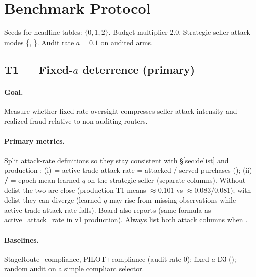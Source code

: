 \documentclass[sigconf,review]{acmart}
\begin{document}
\section{Benchmark Protocol}
\label{sec:protocol}

Seeds for headline tables: $\{0,1,2\}$. Budget multiplier $2.0$. Strategic seller attack modes \{, \}. Audit rate $a=0.1$ on audited arms.

\subsection*{T1 --- Fixed-$a$ deterrence (primary)}

\paragraph{Goal.} Measure whether fixed-rate oversight compresses seller attack intensity and realized fraud relative to non-auditing routers.

\paragraph{Primary metrics.} Split attack-rate definitions so they stay consistent with \S\ref{sec:delist} and production : (i) \textbf{} = active trade attack rate = attacked / served purchases (); (ii) \textbf{ / } = epoch-mean learned $q$ on the strategic seller (separate columns). Without delist the two are close (production T1 means $\approx$0.101 vs $\approx$0.083/0.081); with delist they can diverge (learned $q$ may rise from missing observations while active-trade attack rate falls). 
Board also reports  (same formula as active\_attack\_rate in v1 production). Always list both attack columns when .

\paragraph{Baselines.} StageRoute+compliance, PILOT+compliance (audit rate 0); fixed-$a$ D3 (); random audit on a simple compliant selector.
\end{document}
